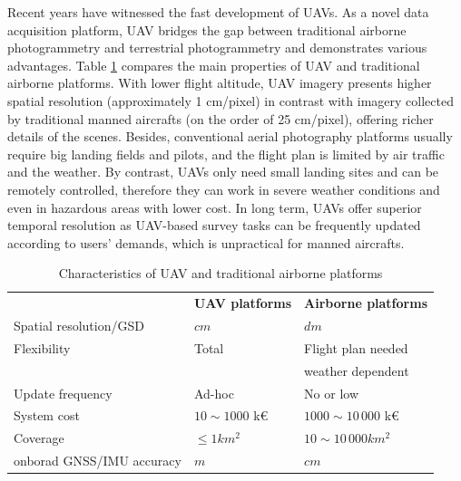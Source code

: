 \documentclass[%
  headings = standardclasses, %
]{tumDiss}
\begin{document}
Recent years have witnessed the fast development of UAVs. As a novel data acquisition platform, UAV bridges the gap between traditional airborne photogrammetry and terrestrial photogrammetry and demonstrates various advantages. Table \ref{tab:comp_charact} compares the main properties of UAV and traditional airborne platforms. With lower flight altitude, UAV imagery presents higher spatial resolution (approximately 1 cm/pixel) in contrast with imagery collected by traditional manned aircrafts (on the order of 25 cm/pixel), offering richer details of the scenes. Besides, conventional aerial photography platforms usually require big landing fields and pilots, and the flight plan is limited by air traffic and the weather. By contrast, UAVs only need small landing sites and can be remotely controlled, therefore they can work in severe weather conditions and even in hazardous areas with lower cost. In long term, UAVs offer superior temporal resolution as UAV-based survey tasks can be frequently updated according to users' demands, which is unpractical for manned aircrafts.
\begin{table}[H]
  \begin{center}
  \small
  \begin{tabular}{@{}p{.32\linewidth}p{.31\linewidth}p{.31\linewidth}@{}}
    \toprule
    {} & {\textbf{UAV platforms}} & {\textbf{Airborne platforms}} \\
    \cmidrule(){1-3}
    Spatial resolution/GSD& $cm$ & $dm$ \\
    \midrule
    Flexibility & Total & Flight plan needed\\&&weather dependent\\
    \midrule
    Update frequency & Ad-hoc & No or low\\
    \midrule
    System cost & $10 \sim1000$ k\euro{} & $1000\sim 10\,000$ k\euro{}\\ 
    \midrule
    Coverage & $\le 1 km^{2}$ & $10 \sim 10\,000km^{2}$ \\
    \midrule
    onborad GNSS/IMU accuracy & $m$ &$cm$\\
    \bottomrule
  \end{tabular}
  \end{center}
  \caption {Characteristics of UAV and traditional airborne platforms \cite{everaerts2008unmanned}}
\label{tab:comp_charact}
\end{table}
\end{document}
